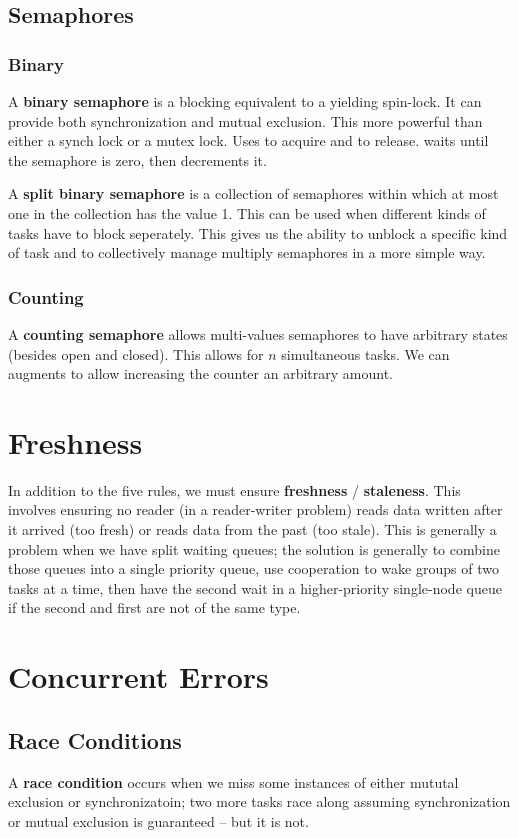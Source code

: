 \documentclass[12pt]{article}
\begin{document}
\subsection{Semaphores}
\subsubsection{Binary}
A {\bf binary semaphore} is a blocking equivalent to a yielding spin-lock. It can provide both synchronization and mutual exclusion. This more powerful than either a synch lock or a mutex lock. Uses  to acquire and  to release.  waits until the semaphore is zero, then decrements it.

A {\bf split binary semaphore} is a collection of semaphores within which at most one in the collection has the value 1. This can be used when different kinds of tasks have to block seperately. This gives us the ability to unblock a specific kind of task and to collectively manage multiply semaphores in a more simple way.

\subsubsection{Counting}
A {\bf counting semaphore} allows multi-values semaphores to have arbitrary states (besides open and closed). This allows for $n$ simultaneous tasks. We can augments  to allow increasing the counter an arbitrary amount.

\section{Freshness}
In addition to the five rules, we must ensure {\bf freshness} / {\bf staleness}. This involves ensuring no reader (in a reader-writer problem) reads data written after it arrived (too fresh) or reads data from the past (too stale). This is generally a problem when we have split waiting queues; the solution is generally to combine those queues into a single priority queue, use cooperation to wake groups of two tasks at a time, then have the second wait in a higher-priority single-node queue if the second and first are not of the same type.

\section{Concurrent Errors}
\subsection{Race Conditions}
A {\bf race condition} occurs when we miss some instances of either mututal exclusion or synchronizatoin; two more tasks race along assuming synchronization or mutual exclusion is guaranteed -- but it is not.
\end{document}

